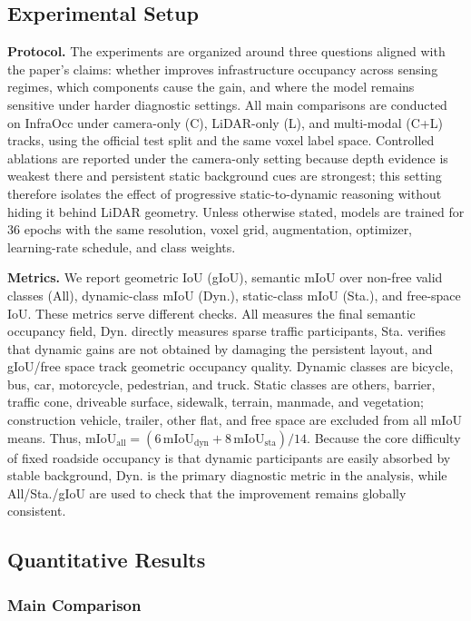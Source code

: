 \subsection{Experimental Setup}


\noindent \textbf{Protocol.}
The experiments are organized around three questions aligned with the paper's
claims: whether \nameplus{} improves infrastructure occupancy across sensing
regimes, which components cause the gain, and where the model remains
sensitive under harder diagnostic settings. All main comparisons are conducted
on InfraOcc under camera-only (C), LiDAR-only (L), and multi-modal (C+L)
tracks, using the official test split and the same voxel label space. Controlled
ablations are reported under the camera-only setting because depth evidence is
weakest there and persistent static background cues are strongest; this setting
therefore isolates the effect of progressive static-to-dynamic reasoning
without hiding it behind LiDAR geometry. Unless otherwise stated, models are
trained for 36 epochs with the same resolution, voxel grid, augmentation,
optimizer, learning-rate schedule, and class weights.

\noindent \textbf{Metrics.}
We report geometric IoU (gIoU), semantic mIoU over non-free valid classes
(All), dynamic-class mIoU (Dyn.), static-class mIoU (Sta.), and free-space IoU.
These metrics serve different checks. All measures the final semantic occupancy
field, Dyn. directly measures sparse traffic participants, Sta. verifies that
dynamic gains are not obtained by damaging the persistent layout, and gIoU/free
space track geometric occupancy quality. Dynamic classes are bicycle, bus, car,
motorcycle, pedestrian, and truck. Static classes are others, barrier,
traffic cone, driveable surface, sidewalk, terrain, manmade, and vegetation;
construction vehicle, trailer, other flat, and free space are excluded from all
mIoU means. Thus, $\mathrm{mIoU}_{\mathrm{all}}=(6\,\mathrm{mIoU}_{\mathrm{dyn}}
+8\,\mathrm{mIoU}_{\mathrm{sta}})/14$. Because the core difficulty of fixed roadside
occupancy is that dynamic participants are easily absorbed by stable
background, Dyn. is the primary diagnostic metric in the analysis, while
All/Sta./gIoU are used to check that the improvement remains globally
consistent.

\subsection{Quantitative Results}
\subsubsection{Main Comparison}




